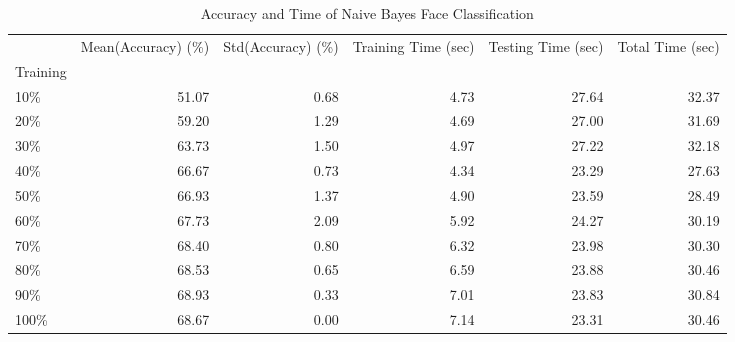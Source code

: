 \documentclass[10pt,parskip=half,
toc=sectionentrywithdots,
bibliography=totocnumbered,
captions=tableheading,numbers=noendperiod]{scrartcl}
\begin{document}
\begin{table}[H]
\caption{Accuracy and Time of Naive Bayes Face Classification}\label{tbl:tlabel}
\centering
\begin{adjustbox}{max width=\textwidth}
\begin{tabular}{lrrrrr}
\toprule
{} &  Mean(Accuracy) (\%) &  Std(Accuracy) (\%) &  Training Time (sec) &  Testing Time (sec) &  Total Time (sec) \\
Training &                     &                    &                      &                     &                   \\
\midrule
10\%      &               51.07 &               0.68 &                 4.73 &               27.64 &             32.37 \\
20\%      &               59.20 &               1.29 &                 4.69 &               27.00 &             31.69 \\
30\%      &               63.73 &               1.50 &                 4.97 &               27.22 &             32.18 \\
40\%      &               66.67 &               0.73 &                 4.34 &               23.29 &             27.63 \\
50\%      &               66.93 &               1.37 &                 4.90 &               23.59 &             28.49 \\
60\%      &               67.73 &               2.09 &                 5.92 &               24.27 &             30.19 \\
70\%      &               68.40 &               0.80 &                 6.32 &               23.98 &             30.30 \\
80\%      &               68.53 &               0.65 &                 6.59 &               23.88 &             30.46 \\
90\%      &               68.93 &               0.33 &                 7.01 &               23.83 &             30.84 \\
100\%     &               68.67 &               0.00 &                 7.14 &               23.31 &             30.46 \\
\bottomrule
\end{tabular}

\end{adjustbox}
\end{table}

\begin{figure}[H]\begin{center}\end{center}\label{fig:flabel}\end{figure}
\end{document}
